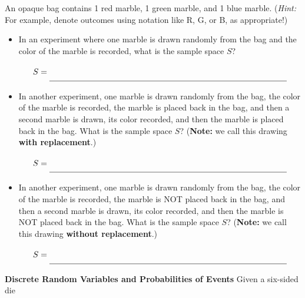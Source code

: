 \documentclass[10pt]{article}
\begin{document}
 An opaque bag contains 1 {\color{red}red} marble, 1 {\color{ForestGreen}green} marble, and 1 {\color{blue}blue} marble. ({\it Hint:} For example, denote outcomes using notation like {\color{red}R}, {\color{ForestGreen}G}, or {\color{blue}B}, as appropriate!)
    \begin{itemize}
    \item[(a)] In an experiment where one marble is drawn randomly from the bag and the color of the marble is recorded, what is the sample space $S$?

    {\Large
    \[
    S =\unlineb{4}{}
    \]
    }

    \item[(b)] In another experiment, one marble is drawn randomly from the bag, the color of the marble is recorded, the marble is placed back in the bag, and then a second marble is drawn, its color recorded, and then the marble is placed back in the bag. What is the sample space $S$? ({\bf Note:} we call this drawing {\bf with replacement}.)

    {\Large
    \[
    S = \unlineb{4}{}
    \]
    }

    \item[(c)] In another experiment, one marble is drawn randomly from the bag, the color of the marble is recorded, the marble is NOT placed back in the bag, and then a second marble is drawn, its color recorded, and then the marble is NOT placed back in the bag. What is the sample space $S$? ({\bf Note:} we call this drawing {\bf without replacement}.)

    {\Large
    \[
    S = \unlineb{4}{}
    \]
    }
    
    \end{itemize}

\newpage%

{\bf Discrete Random Variables and Probabilities of Events}
\example Given a six-sided die
\end{document}
